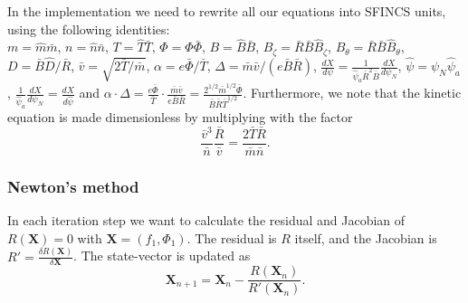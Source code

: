 \documentclass[12pt]{article}
\begin{document}
\noindent In the implementation we need to rewrite all our equations into SFINCS units, using the following identities:\\
$m = \hat{m} \bar{m}$, $n = \hat{n} \bar{n}$, $T = \hat{T} \bar{T}$, $\Phi = \hat{\Phi} \bar{\Phi}$, 
$B = \hat{B} \bar{B}$, $B_\zeta = \bar{R} \bar{B} \hat{B}_\zeta$, $B_\theta = \bar{R} \bar{B} \hat{B}_\theta$, $D = \bar{B} \hat{D} / \bar{R}$, 
$\bar{v} = \sqrt{2 \bar{T} / \bar{m}}$, $\alpha = e \bar{\Phi} / \bar{T}$,  $\Delta = \bar{m} \bar{v} / \left(e \bar{B} \bar{R} \right)$, $\displaystyle \frac{d X}{d \psi} = \frac{1}{\hat{\psi}_a \bar{R}^2 \bar{B}} \frac{d X}{d \psi_N}$, 
$\hat{\psi} = \psi_N \hat{\psi}_a$, $\displaystyle \frac{1}{\hat{\psi}_a} \frac{d X}{d \psi_N} = \frac{d X}{d \hat{\psi}}$ 
and 
$\displaystyle \alpha \cdot \Delta = \frac{e \bar{\Phi}}{\bar{T}} \cdot \frac{\bar{m} \bar{v}}{e \bar{B} \bar{R}} = \frac{2^{1/2} \bar{m}^{1/2} \bar{\Phi}}{\bar{B} \bar{R} \bar{T}^{1/2}}$. 
Furthermore, we note that the kinetic equation is made dimensionless by multiplying with the factor 
\begin{equation}
  \label{eq:DimensionlessFactor}
  \frac{\bar{v}^3}{\bar{n}} \frac{\bar{R}}{\bar{v}} = \frac{2 \bar{T} \bar{R}}{\bar{m} \bar{n}}.
\end{equation}

\subsubsection*{Newton's method}
In each iteration step we want to calculate the residual and Jacobian of $R\left(\bm{X}\right) = 0$ with $\bm{X} = \left(f_{1}, \Phi_1\right)$. 
The residual is $R$ itself, and the Jacobian is $\displaystyle R' = \frac{\delta R\left(\bm{X}\right)}{\delta \bm{X}}$. 
The state-vector is updated as
\begin{equation}
  \label{eq:StateVectorUpdate}
  \bm{X}_{n+1} = \bm{X}_{n} - \frac{R\left(\bm{X}_{n}\right)}{R'\left(\bm{X}_{n}\right)}.
\end{equation}

\newpage
\end{document}
